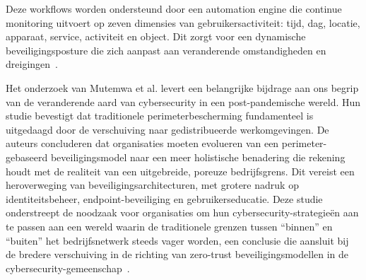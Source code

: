 Deze workflows worden ondersteund door een automation engine die continue monitoring uitvoert op zeven dimensies van gebruikersactiviteit: tijd, dag, locatie, apparaat, service, activiteit en object. Dit zorgt voor een dynamische beveiligingsposture die zich aanpast aan veranderende omstandigheden en dreigingen~\autocite{Netskope2020}.

Het onderzoek van Mutemwa et al. levert een belangrijke bijdrage aan ons begrip van de veranderende aard van cybersecurity in een post-pandemische wereld. Hun studie bevestigt dat traditionele perimeterbescherming fundamenteel is uitgedaagd door de verschuiving naar gedistribueerde werkomgevingen.
De auteurs concluderen dat organisaties moeten evolueren van een perimeter-gebaseerd beveiligingsmodel naar een meer holistische benadering die rekening houdt met de realiteit van een uitgebreide, poreuze bedrijfsgrens. Dit vereist een heroverweging van beveiligingsarchitecturen, met grotere nadruk op identiteitsbeheer, endpoint-beveiliging en gebruikerseducatie.
Deze studie onderstreept de noodzaak voor organisaties om hun cybersecurity-strategieën aan te passen aan een wereld waarin de traditionele grenzen tussen “binnen” en “buiten” het bedrijfsnetwerk steeds vager worden, een conclusie die aansluit bij de bredere verschuiving in de richting van zero-trust beveiligingsmodellen in de cybersecurity-gemeenschap~\autocite{ACM2021}.